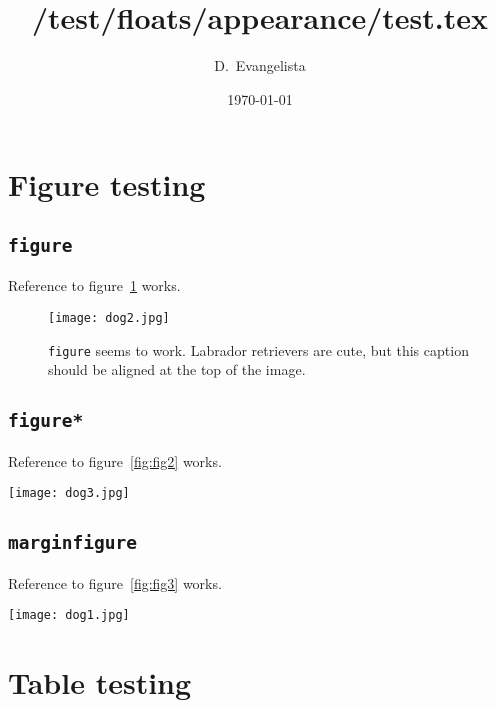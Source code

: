 \documentclass{article}
\title{/test/floats/appearance/test.tex}
\author{D.~Evangelista}
\date{\today}
\begin{document}
\maketitle

\section{Figure testing}
\subsection{\texttt{figure}}
Reference to figure~\ref{fig:fig1} works.
\begin{figure}[h]
\begin{center}
\texttt{[image: dog2.jpg]}
\end{center}
\caption{\texttt{figure} seems to work. Labrador retrievers are cute, but this caption should be aligned at the top of the image.}
\label{fig:fig1}
\end{figure}

\subsection{\texttt{figure*}}
Reference to figure~\ref{fig:fig2} works.
\begin{figure*}[h]
\begin{center}
\texttt{[image: dog3.jpg]}
\end{center}
\caption{\texttt{figure*} also seems to work, but the width is not as wide as expected when using textwidth or columnwidth? hmmm.}
\label{fig:fig2}
\end{figure*}

\subsection{\texttt{marginfigure}}
Reference to figure~\ref{fig:fig3} works.
\begin{marginfigure}
\begin{center}
\texttt{[image: dog1.jpg]}
\end{center}
\caption{\texttt{marginfigure} here. Puppies are cute.}
\label{fig:fig3}
\end{marginfigure}

\clearpage
\section{Table testing}
\end{document}
